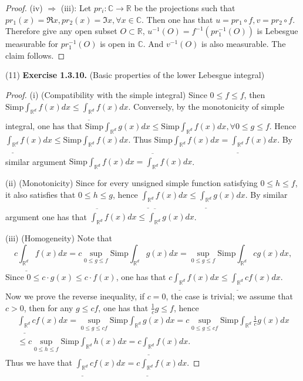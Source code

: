 \documentclass[a4paper]{article}
\begin{document}
\begin{proof}
(iv) $\Rightarrow$ (iii): Let $pr_i: \mathbb{C} \to \mathbb{R}$ be the projections such that $pr_1(x) = \Re x, pr_2(x)
= \Im x, \forall x \in \mathbb{C}$. Then one has that $u = pr_1 \circ f, v = pr_2  \circ f$. Therefore give any 
open subset $O \subset \mathbb{R}$, $u^{-1}(O) = f^{-1}(pr_1^{-1}(O))$ is Lebesgue measurable for $pr_1^{-1}(O)$
is open in $\mathbb{C}$. And $v^{-1}(O)$ is also measurable. The claim follows.
\end{proof}

(11) {\bfseries Exercise 1.3.10.} (Basic properties of the lower Lebesgue integral) \begin{proof}
(i) (Compatibility with the simple integral) Since $0 \leq f \leq f$, then $\mathrm{Simp}\int_{\mathbb{R}^d} f(x) dx\leq
\underline{\int_{\mathbb{R}^d}}f(x)dx$. Conversely, by the monotonicity of simple integral, one has that 
$\mathrm{Simp}\int_{\mathbb{R}^d} g(x)dx \leq \mathrm{Simp}\int_{\mathbb{R}^d} f(x) dx, \forall 0 \leq g \leq f$.
Hence $ \underline{\int_{\mathbb{R}^d}}f(x)dx \leq \mathrm{Simp}\int_{\mathbb{R}^d} f(x) dx$. Thus
$\mathrm{Simp}\int_{\mathbb{R}^d} f(x) dx = \underline{\int_{\mathbb{R}^d}}f(x)dx$. By similar argument 
$\mathrm{Simp}\int_{\mathbb{R}^d} f(x) dx = \overline{\int_{\mathbb{R}^d}}f(x)dx$.

(ii) (Monotonicity) Since for every unsigned simple function satisfying $0 \leq h \leq f$, it also satisfies that
$0 \leq h \leq g$, hence $\underline{\int_{\mathbb{R}^d}}f(x) dx \leq \underline{\int_{\mathbb{R}^d}}g(x) dx$.
By similar argument one has that $\overline{\int_{\mathbb{R}^d}}f(x) dx \leq \overline{\int_{\mathbb{R}^d}}g(x) dx$.

(iii) (Homogeneity) Note that $$
c\underline{\int_{\mathbb{R}^d}}f(x) dx = c\sup_{0 \leq g \leq f} \mathrm{Simp}\int_{\mathbb{R}^d} g(x) dx
= \sup_{0 \leq g \leq f} \mathrm{Simp}\int_{\mathbb{R}^d} cg(x) dx,
$$Since $0 \leq c\cdot g(x) \leq c\cdot f(x)$, one has that $c\underline{\int_{\mathbb{R}^d}} f(x) dx \leq 
\underline{\int_{\mathbb{R}^d}} cf(x) dx$. Now we prove the reverse inequality, if $c = 0$, the case is trivial;
we assume that $c > 0$, then for any $g \leq cf$, one has that $\frac{1}{c}g \leq f$, hence \begin{multline*}
\underline{\int_{\mathbb{R}^d}} cf(x) dx = \sup_{0 \leq g \leq cf} \mathrm{Simp}\int_{\mathbb{R}^d}g(x) dx
= c \sup_{0 \leq g \leq cf} \mathrm{Simp}\int_{\mathbb{R}^d} \frac{1}{c} g(x) dx \\\leq
c \sup_{0 \leq h \leq f} \mathrm{Simp}\int_{\mathbb{R}^d} h(x) dx = c\underline{\int_{\mathbb{R}^d}} f(x)dx.
\end{multline*}
Thus we have that $\underline{\int_{\mathbb{R}^d}} cf(x)dx = c\underline{\int_{\mathbb{R}^d}} f(x)dx$.


\end{proof}
\end{document}
